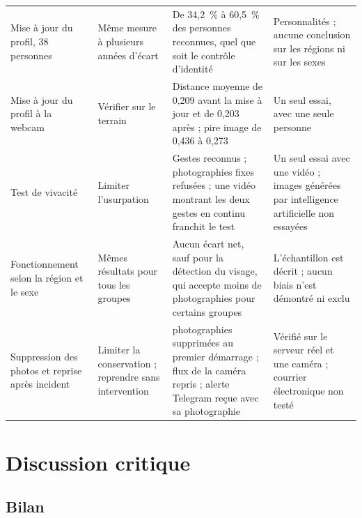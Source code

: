{\begin{longtable}{@{}>{\raggedright\arraybackslash}p{2.2cm}>{\raggedright\arraybackslash}p{2.9cm}>{\raggedright\arraybackslash}p{5.2cm}>{\raggedright\arraybackslash}p{4cm}@{}}
Mise à jour du profil, 38 personnes & Même mesure à plusieurs années d'écart & De 34,2~\% à 60,5~\% des personnes reconnues, quel que soit le contrôle d'identité & Personnalités ; aucune conclusion sur les régions ni sur les sexes \\
Mise à jour du profil à la webcam & Vérifier sur le terrain & Distance moyenne de 0,209 avant la mise à jour et de 0,203 après ; pire image de 0,436 à 0,273 & Un seul essai, avec une seule personne \\
Test de vivacité & Limiter l'usurpation & Gestes reconnus ; photographies fixes refusées ; une vidéo montrant les deux gestes en continu franchit le test & Un seul essai avec une vidéo ; images générées par intelligence artificielle non essayées \\
Fonctionnement selon la région et le sexe & Mêmes résultats pour tous les groupes & Aucun écart net, sauf pour la détection du visage, qui accepte moins de photographies pour certains groupes & L'échantillon est décrit ; aucun biais n'est démontré ni exclu \\
Suppression des photos et reprise après incident & Limiter la conservation ; reprendre sans intervention & 41 photographies supprimées au premier démarrage ; flux de la caméra repris ; alerte Telegram reçue avec sa photographie & Vérifié sur le serveur réel et une caméra ; courrier électronique non testé \\
\bottomrule
\end{longtable}
}

\section{Discussion critique}

\subsection{Bilan}

